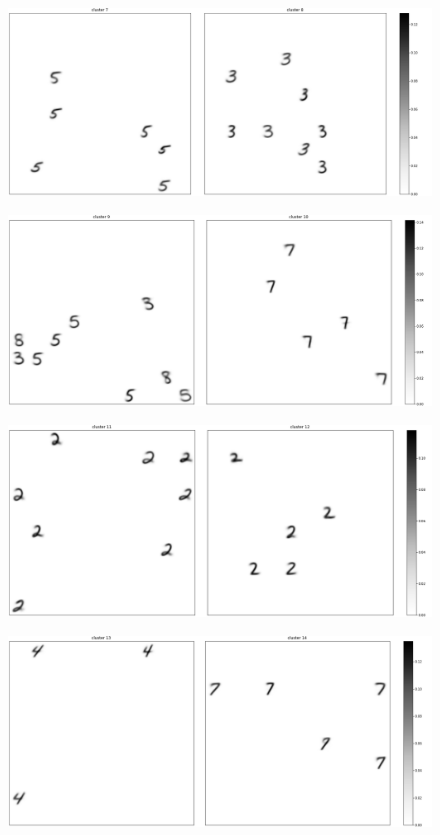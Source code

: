 \documentclass[a4paper]{report}
\begin{document}
\begin{figure} [H]
    \centering
    \includegraphics [width=\textwidth ] {c/h/7.png}
    \caption{}
\end{figure}

\begin{figure} [H]
    \centering
    \includegraphics [width=\textwidth ] {c/h/9.png}
    \caption{}
\end{figure}

\begin{figure} [H]
    \centering
    \includegraphics [width=\textwidth ] {c/h/11.png}
    \caption{}
\end{figure}

\begin{figure} [H]
    \centering
    \includegraphics [width=\textwidth ] {c/h/13.png}
    \caption{}
\end{figure}
\end{document}
